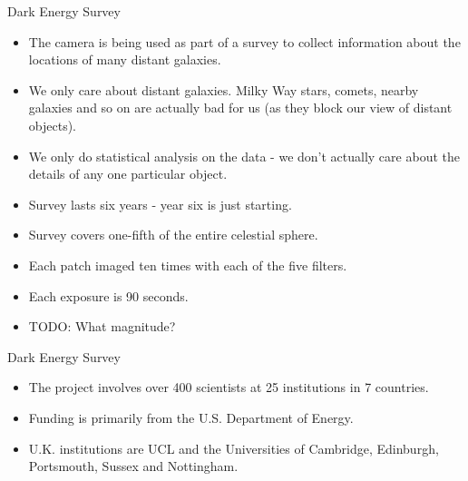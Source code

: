 \documentclass[usenames,dvipsnames]{beamer}
\begin{document}


\begin{frame}{Dark Energy Survey}
  \begin{block}{}
    \begin{itemize}
      \item{The camera is being used as part of a survey to collect information about the locations of many distant galaxies.}
      \item{We only care about distant galaxies. Milky Way stars, comets, nearby galaxies and so on are actually bad for us (as they block our view of distant objects).} 
      \item{We only do statistical analysis on the data - we don't actually care about the details of any one particular object.}
      \item{Survey lasts six years - year six is just starting.}
      \item{Survey covers one-fifth of the entire celestial sphere.}
      \item{Each patch imaged ten times with each of the five filters.}
      \item{Each exposure is 90 seconds.} %
      \item{TODO: What magnitude?}
    \end{itemize}
  \end{block}
\end{frame}


\begin{frame}{Dark Energy Survey}
  \begin{block}{}
    \begin{itemize}
      \item{The project involves over 400 scientists at 25 institutions in 7 countries.}
      \item{Funding is primarily from the U.S. Department of Energy.}
      \item{U.K. institutions are UCL and the Universities of Cambridge, Edinburgh, Portsmouth, Sussex and Nottingham.}
    \end{itemize}
  \end{block}
\end{frame}
\end{document}
